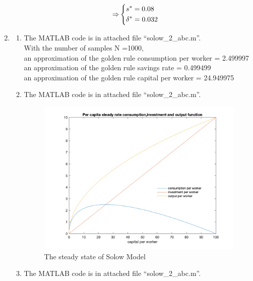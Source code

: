 \documentclass{article}
\begin{document}
\begin{enumerate}
\begin{enumerate}
\begin{align*}
        	\Rightarrow&
		 	\begin{dcases}s^\ast=0.08\\\delta^\ast=0.032\end{dcases}
        \end{align*}
    \end{enumerate}
    \item 
    \begin{enumerate}
    	\item The MATLAB code is in attached file ``solow\_2\_abc.m''.\\
    	With the number of samples N =1000,\\
	    an approximation of the golden rule consumption per worker = 2.499997\\
	 	an approximation of the golden rule savings rate =  0.499499\\
	 	an approximation of the golden rule capital per worker =  24.949975\\
	    \newpage
	    \item The MATLAB code is in attached file ``solow\_2\_abc.m''.
	    \begin{figure}[h!]
			  \includegraphics[width=\linewidth]{1_2b.png}
			  \caption{The steady state of Solow Model}
			\end{figure}
		\newpage
		\item The MATLAB code is in attached file ``solow\_2\_abc.m''.
	    \begin{figure}[h!]

\end{figure}
\end{enumerate}
\end{enumerate}
\end{document}
